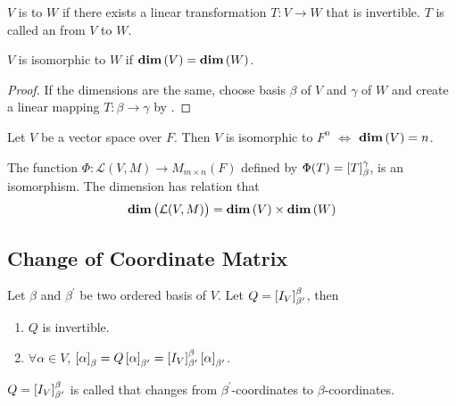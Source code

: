 \begin{definition}
	$V$ is  to $W$ if there exists a linear transformation $T:V\rightarrow W$ that is invertible. $T$ is called an   from $V$ to $W$.
\end{definition}

\begin{theorem}
	$V$ is isomorphic to $W$ if $\displaystyle \mathbf{dim}\left( V \right) = \displaystyle \mathbf{dim}\left( W \right)$.
\end{theorem}

\begin{proof}
	If the dimensions are the same, choose basis $\beta$ of $V$ and $\gamma$ of $W$ and create a linear mapping $T:\beta \rightarrow \gamma$ by .
\end{proof}


\begin{theorem}
	Let $V$ be a vector space over $F$. Then $V$ is isomorphic to $F^n$ $\Leftrightarrow$ $\displaystyle \mathbf{dim}\left( V \right) = n$.
\end{theorem}


\begin{theorem}
	The function $\Phi: \mathcal{L}(V,M) \rightarrow M_{m \times n}(F)$ defined by $\Phi (T) = \coordinate{T}_\beta^\gamma$, is an isomorphism. The dimension has relation that 
	\begin{equation}
		\displaystyle \mathbf{dim}\left( \mathcal{L}(V,M) \right) = \displaystyle \mathbf{dim}\left( V \right) \times \displaystyle \mathbf{dim}\left( W \right)
	\end{equation}
\end{theorem}


\subsection{Change of Coordinate Matrix}


\begin{theorem}
	Let $\beta$ and $\beta^\prime$ be two ordered basis of $V$. Let $Q = \coordinate{I_V}_{\beta^\prime}^\beta$, then
	\begin{enumerate}
		\item $Q$ is invertible.
		\item $\forall \alpha \in V$, $\coordinate{\alpha}_\beta = Q \coordinate{\alpha}_{\beta^\prime} = \coordinate{I_V}_{\beta^\prime}^\beta \coordinate{\alpha}_{\beta^\prime}$.
	\end{enumerate}
	
	$Q= \coordinate{I_V}_{\beta^\prime}^\beta$ is called  that changes from $\beta^\prime$-coordinates to $\beta$-coordinates.
\end{theorem}

